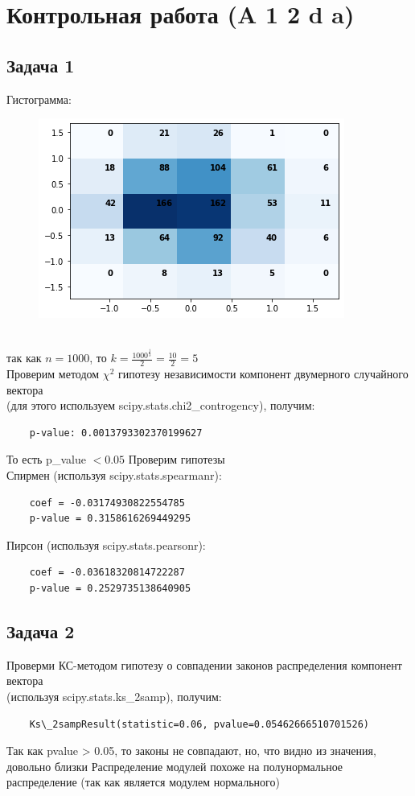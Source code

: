 \section*{Контрольная работа (A 1 2 d a)}
\subsection*{Задача 1}
Гистограмма:
\begin{figure}[h]
\includegraphics[scale=0.65]{hist.png}
\end{figure}\\
так как $n = 1000$, то $k = \frac{1000^{\frac{1}{3}}}{2} = \frac{10}{2} = 5$\\
Проверим методом $\chi^2$ гипотезу независимости компонент двумерного случайного вектора\\
(для этого используем scipy.stats.chi2\_controgency), получим:
\begin{verbatim}
    p-value: 0.0013793302370199627
\end{verbatim}
То есть p\_value $< 0.05$
\vskip 0.1in \noindent
Проверим гипотезы\\
Спирмен (используя scipy.stats.spearmanr): 
\begin{verbatim}
    coef = -0.03174930822554785
    p-value = 0.3158616269449295
\end{verbatim}
Пирсон (используя scipy.stats.pearsonr): 
\begin{verbatim}
    coef = -0.03618320814722287
    p-value = 0.2529735138640905
\end{verbatim}
\vskip 0.3in



\subsection*{Задача 2}
Проверми КС-методом гипотезу о совпадении законов распределения компонент вектора\\
(используя scipy.stats.ks\_2samp), получим:
\begin{verbatim}
    Ks\_2sampResult(statistic=0.06, pvalue=0.05462666510701526)
\end{verbatim}
Так как pvalue > 0.05, то законы не совпадают, но, что видно из значения, довольно близки
\vskip 0.2in \noindent
Распределение модулей похоже на полунормальное распределение (так как является модулем нормального)
\vskip 0.4in



